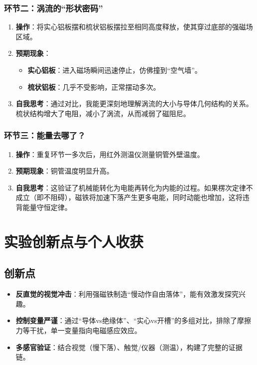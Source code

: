 \documentclass[a4paper,12pt]{article}
\begin{document}
\subsubsection{环节二：涡流的“形状密码”}
\begin{enumerate}
    \item \textbf{操作}：将实心铝板摆和梳状铝板摆拉至相同高度释放，使其穿过底部的强磁场区域。
    \item \textbf{预期现象}：
    \begin{itemize}
        \item \textbf{实心铝板}：进入磁场瞬间迅速停止，仿佛撞到“空气墙”。
        \item \textbf{梳状铝板}：几乎不受影响，正常摆动多次。
    \end{itemize}
    \item \textbf{自我思考}：通过对比，我能更深刻地理解涡流的大小与导体几何结构的关系。梳状结构增大了电阻，减小了涡流，从而减弱了磁阻尼。
\end{enumerate}

\subsubsection{环节三：能量去哪了？}
\begin{enumerate}
    \item \textbf{操作}：重复环节一多次后，用红外测温仪测量铜管外壁温度。
    \item \textbf{预期现象}：铜管温度明显升高。
    \item \textbf{自我思考}：这验证了机械能转化为电能再转化为内能的过程。如果楞次定律不成立（即不阻碍），磁铁将加速下落产生更多电能，同时动能也增加，这将违背能量守恒定律。
\end{enumerate}

\section{实验创新点与个人收获}

\subsection{创新点}
\begin{itemize}
    \item \textbf{反直觉的视觉冲击}：利用强磁铁制造“慢动作自由落体”，能有效激发探究兴趣。
    \item \textbf{控制变量严谨}：通过“导体vs绝缘体”、“实心vs开槽”的多组对比，排除了摩擦力等干扰，单一变量指向电磁感应效应。
    \item \textbf{多感官验证}：结合视觉（慢下落）、触觉/仪器（测温），构建了完整的证据链。
\end{itemize}
\end{document}
